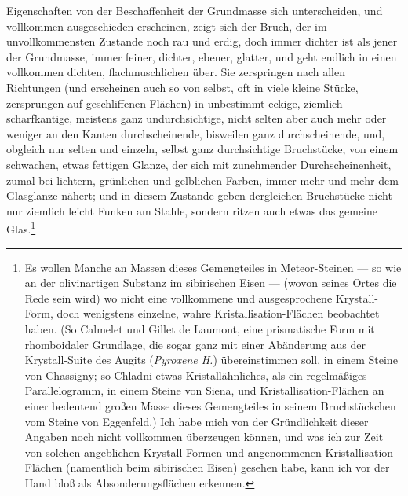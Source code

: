 \documentclass[a4paper, 11pt, oneside, german]{article}
\begin{document}
Eigenschaften von der Beschaffenheit der Grundmasse sich unterscheiden, und vollkommen ausgeschieden erscheinen, zeigt sich der Bruch, der im unvollkommensten Zustande noch rau und erdig, doch immer dichter ist als jener der Grundmasse, immer feiner, dichter, ebener, glatter, und geht endlich in einen vollkommen dichten, flachmuschlichen über. Sie zerspringen nach allen Richtungen (und erscheinen auch so von selbst, oft in viele kleine Stücke, zersprungen auf geschliffenen Flächen) in unbestimmt eckige, ziemlich scharfkantige, meistens ganz undurchsichtige, nicht selten aber auch mehr oder weniger an den Kanten durchscheinende, bisweilen ganz durchscheinende, und, obgleich nur selten und einzeln, selbst ganz durchsichtige Bruchstücke, von einem schwachen, etwas fettigen Glanze, der sich mit zunehmender Durchscheinenheit, zumal bei lichtern, grünlichen und gelblichen Farben, immer mehr und mehr dem Glasglanze nähert; und in diesem Zustande geben dergleichen Bruchstücke nicht nur ziemlich leicht Funken am Stahle, sondern ritzen auch etwas das gemeine Glas.\footnote{Es wollen Manche an Massen dieses Gemengteiles in Meteor-Steinen --- so wie an der olivinartigen Substanz im sibirischen Eisen --- (wovon seines Ortes die Rede sein wird) wo nicht eine vollkommene und ausgesprochene Krystall-Form, doch wenigstens einzelne, wahre Kristallisation-Flächen beobachtet haben. (So Calmelet und Gillet de Laumont, eine prismatische Form mit rhomboidaler Grundlage, die sogar ganz mit einer Abänderung aus der Krystall-Suite des Augits (\emph{Pyroxene H.}) übereinstimmen soll, in einem Steine von Chassigny; so Chladni etwas Kristallähnliches, als ein regelmäßiges Parallelogramm, in einem Steine von Siena, und Kristallisation-Flächen an einer bedeutend großen Masse dieses Gemengteiles in seinem Bruchstückchen vom Steine von Eggenfeld.) Ich habe mich von der Gründlichkeit dieser Angaben noch nicht vollkommen überzeugen können, und was ich zur Zeit von solchen angeblichen Krystall-Formen und angenommenen Kristallisation-Flächen (namentlich beim sibirischen Eisen) gesehen habe, kann ich vor der Hand bloß als Absonderungsflächen erkennen.}
\end{document}
